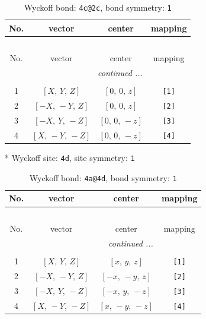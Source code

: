 \documentclass[fleqn,8pt]{jsarticle}
\begin{document}
\begin{longtable}{cccc}
\caption{Wyckoff bond: {\tt 4c@2c}, bond symmetry: {\tt 1}}
 \\
 \hline \hline
No. & vector & center & mapping \\ \hline \endfirsthead

\multicolumn{3}{l}{\tablename\ \thetable{}} \\
 \hline \hline
No. & vector & center & mapping \\ \hline \endhead

 \hline \hline
\multicolumn{3}{r}{\footnotesize\it continued ...} \\ \endfoot

 \hline \hline
\multicolumn{3}{r}{} \\ \endlastfoot

1 & $\left[ X,\, Y,\, Z \right]$ & $\left[ 0,\, 0,\, z \right]$ & {\tt [1]} \\ \hline
2 & $\left[ - X,\, - Y,\, Z \right]$ & $\left[ 0,\, 0,\, z \right]$ & {\tt [2]} \\ \hline
3 & $\left[ - X,\, Y,\, - Z \right]$ & $\left[ 0,\, 0,\, - z \right]$ & {\tt [3]} \\ \hline
4 & $\left[ X,\, - Y,\, - Z \right]$ & $\left[ 0,\, 0,\, - z \right]$ & {\tt [4]} \\
\end{longtable}
* Wyckoff site: {\tt 4d}, site symmetry: {\tt 1}
\renewcommand{\arraystretch}{1.2}
\begin{longtable}{cccc}
\caption{Wyckoff bond: {\tt 4a@4d}, bond symmetry: {\tt 1}}
 \\
 \hline \hline
No. & vector & center & mapping \\ \hline \endfirsthead

\multicolumn{3}{l}{\tablename\ \thetable{}} \\
 \hline \hline
No. & vector & center & mapping \\ \hline \endhead

 \hline \hline
\multicolumn{3}{r}{\footnotesize\it continued ...} \\ \endfoot

 \hline \hline
\multicolumn{3}{r}{} \\ \endlastfoot

1 & $\left[ X,\, Y,\, Z \right]$ & $\left[ x,\, y,\, z \right]$ & {\tt [1]} \\ \hline
2 & $\left[ - X,\, - Y,\, Z \right]$ & $\left[ - x,\, - y,\, z \right]$ & {\tt [2]} \\ \hline
3 & $\left[ - X,\, Y,\, - Z \right]$ & $\left[ - x,\, y,\, - z \right]$ & {\tt [3]} \\ \hline
4 & $\left[ X,\, - Y,\, - Z \right]$ & $\left[ x,\, - y,\, - z \right]$ & {\tt [4]} \\
\end{longtable}
\end{document}
